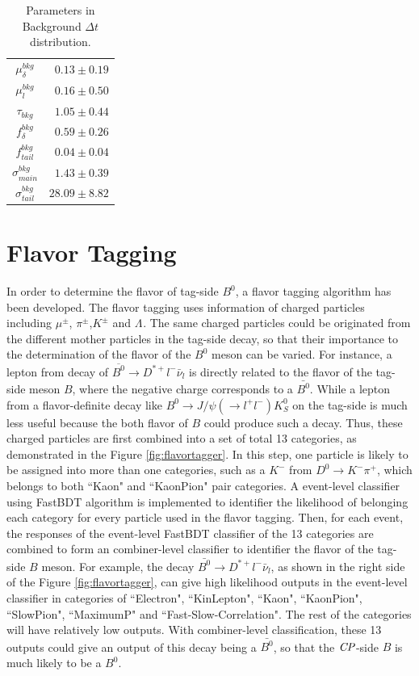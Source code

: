\begin{table}[htpb]
	\centering
	\begin{tabular}{|c|r|}
		\hline
		$\mu^{bkg}_{\delta}$ & $0.13 \pm 0.19$\\
		$\mu^{bkg}_{l}$&  $0.16 \pm 0.50$ \\
		$\tau_{bkg}$ & $1.05\pm 0.44$\\
		$f_{\delta}^{bkg}$ &  $0.59\pm 0.26$\\
		$f^{bkg}_{tail}$  & $0.04\pm 0.04$ \\
		$\sigma^{bkg}_{main}$ & $1.43\pm 0.39$\\
		$\sigma^{bkg}_{tail}$ & $28.09 \pm 8.82$\\
		\hline
	\end{tabular}
	\caption{Parameters in Background $\Delta t$ distribution. }
	\label{tab:Pbkg}
\end{table}

\section{Flavor Tagging}
 In order to determine the flavor of tag-side $B^0$, a flavor tagging algorithm has been developed. The flavor tagging uses information of charged particles including $\mu^{\pm}$, $\pi^{\pm}$,$K^{\pm}$ and $\Lambda^{}$. The same charged particles could be originated from the different mother particles in the tag-side decay, so that their importance to the determination of the flavor of the $B^0$ meson can be varied. For instance, a lepton from decay of $\overline{B^0}\to D^{*+}l^{-}\bar{\nu}_l$ is directly related to the flavor of the tag-side meson $B$, where the negative charge corresponds to a $\bar{B^0}$. While a lepton from a flavor-definite decay like $B^0\to J/\psi(\to l^+l^-) K^0_S$ on the tag-side is much less useful because the both flavor of $B$ could produce such a decay. Thus, these charged particles are first combined into a set of total 13 categories, as demonstrated in the Figure \ref{fig:flavortagger}. In this step, one particle is likely to be assigned into more than one categories, such as a $K^-$ from $D^0\to K^-\pi^+$, which belongs to both ``Kaon" and ``KaonPion" pair categories. A event-level classifier using FastBDT algorithm is implemented to identifier the likelihood of belonging each category for every particle used in the flavor tagging. Then, for each event, the responses of the event-level FastBDT classifier of the 13 categories are combined to form an combiner-level classifier to identifier the flavor of the tag-side $B$ meson. For example, the decay $\bar{B^0}\to D^{*+}l^{-}\bar{\nu}_l$, as shown in the right side of the Figure \ref{fig:flavortagger}, can give high likelihood outputs in the event-level classifier in categories of ``Electron", ``KinLepton", ``Kaon", ``KaonPion", ``SlowPion", ``MaximumP" and ``Fast-Slow-Correlation". The rest of the categories will have relatively low outputs. With combiner-level classification, these 13 outputs could give an output of this decay being a  $\bar{B^0}$, so that the $\it{CP}$-side $B$ is much likely to be a $B^0$. 

